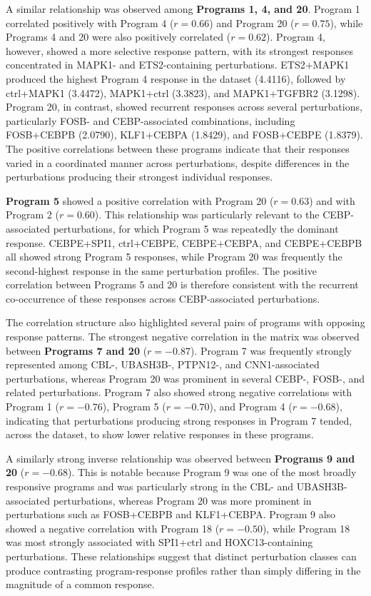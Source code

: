 \documentclass[11pt,a4paper]{article}
\begin{document}
A similar relationship was observed among \textbf{Programs 1, 4, and 20}. Program 1 correlated positively with Program 4 ($r=0.66$) and Program 20 ($r=0.75$), while Programs 4 and 20 were also positively correlated ($r=0.62$). Program 4, however, showed a more selective response pattern, with its strongest responses concentrated in MAPK1- and ETS2-containing perturbations. ETS2+MAPK1 produced the highest Program 4 response in the dataset (4.4116), followed by ctrl+MAPK1 (3.4472), MAPK1+ctrl (3.3823), and MAPK1+TGFBR2 (3.1298). Program 20, in contrast, showed recurrent responses across several perturbations, particularly FOSB- and CEBP-associated combinations, including FOSB+CEBPB (2.0790), KLF1+CEBPA (1.8429), and FOSB+CEBPE (1.8379). The positive correlations between these programs indicate that their responses varied in a coordinated manner across perturbations, despite differences in the perturbations producing their strongest individual responses.

\textbf{Program 5} showed a positive correlation with Program 20 ($r=0.63$) and with Program 2 ($r=0.60$). This relationship was particularly relevant to the CEBP-associated perturbations, for which Program 5 was repeatedly the dominant response. CEBPE+SPI1, ctrl+CEBPE, CEBPE+CEBPA, and CEBPE+CEBPB all showed strong Program 5 responses, while Program 20 was frequently the second-highest response in the same perturbation profiles. The positive correlation between Programs 5 and 20 is therefore consistent with the recurrent co-occurrence of these responses across CEBP-associated perturbations.

The correlation structure also highlighted several pairs of programs with opposing response patterns. The strongest negative correlation in the matrix was observed between \textbf{Programs 7 and 20} ($r=-0.87$). Program 7 was frequently strongly represented among CBL-, UBASH3B-, PTPN12-, and CNN1-associated perturbations, whereas Program 20 was prominent in several CEBP-, FOSB-, and related perturbations. Program 7 also showed strong negative correlations with Program 1 ($r=-0.76$), Program 5 ($r=-0.70$), and Program 4 ($r=-0.68$), indicating that perturbations producing strong responses in Program 7 tended, across the dataset, to show lower relative responses in these programs.

A similarly strong inverse relationship was observed between \textbf{Programs 9 and 20} ($r=-0.68$). This is notable because Program 9 was one of the most broadly responsive programs and was particularly strong in the CBL- and UBASH3B-associated perturbations, whereas Program 20 was more prominent in perturbations such as FOSB+CEBPB and KLF1+CEBPA. Program 9 also showed a negative correlation with Program 18 ($r=-0.50$), while Program 18 was most strongly associated with SPI1+ctrl and HOXC13-containing perturbations. These relationships suggest that distinct perturbation classes can produce contrasting program-response profiles rather than simply differing in the magnitude of a common response.
\end{document}
